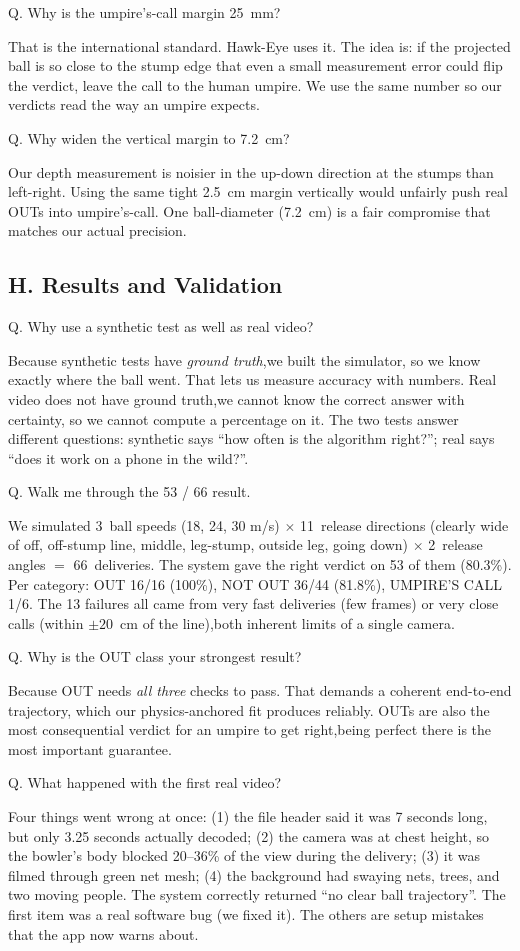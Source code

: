 \documentclass[11pt,a4paper]{article}
\newcommand{\qa}[2]{%
  \par\vspace{8pt}%
  \noindent
  \colorbox{NavyTint}{%
    \begin{minipage}{\dimexpr\textwidth-2\fboxsep\relax}%
      \color{white}\bfseries\strut Q. #1%
    \end{minipage}%
  }\par\nobreak
  \noindent
  \colorbox{MutedBg}{%
    \begin{minipage}{\dimexpr\textwidth-2\fboxsep\relax}%
      \color{black}\setlength{\parskip}{4pt}\strut #2\strut%
    \end{minipage}%
  }%
  \par\vspace{6pt}%
}
\begin{document}
\qa{Why is the umpire's-call margin 25~mm?}{%
That is the international standard. Hawk-Eye uses it. The idea is: if the projected ball is so close to the stump edge that even a small measurement error could flip the verdict, leave the call to the human umpire. We use the same number so our verdicts read the way an umpire expects.}

\qa{Why widen the vertical margin to 7.2~cm?}{%
Our depth measurement is noisier in the up-down direction at the stumps than left-right. Using the same tight 2.5~cm margin vertically would unfairly push real OUTs into umpire's-call. One ball-diameter (7.2~cm) is a fair compromise that matches our actual precision.}

\subsection{H. Results and Validation}

\qa{Why use a synthetic test as well as real video?}{%
Because synthetic tests have \emph{ground truth},we built the simulator, so we know exactly where the ball went. That lets us measure accuracy with numbers. Real video does not have ground truth,we cannot know the correct answer with certainty, so we cannot compute a percentage on it. The two tests answer different questions: synthetic says ``how often is the algorithm right?''; real says ``does it work on a phone in the wild?''.}

\qa{Walk me through the 53 / 66 result.}{%
We simulated 3~ball speeds (18, 24, 30 m/s) $\times$ 11~release directions (clearly wide of off, off-stump line, middle, leg-stump, outside leg, going down) $\times$ 2~release angles $=$ 66~deliveries. The system gave the right verdict on 53 of them (80.3\%). Per category: OUT 16/16 (100\%), NOT OUT 36/44 (81.8\%), UMPIRE'S CALL 1/6. The 13 failures all came from very fast deliveries (few frames) or very close calls (within ${\pm}20$~cm of the line),both inherent limits of a single camera.}

\qa{Why is the OUT class your strongest result?}{%
Because OUT needs \emph{all three} checks to pass. That demands a coherent end-to-end trajectory, which our physics-anchored fit produces reliably. OUTs are also the most consequential verdict for an umpire to get right,being perfect there is the most important guarantee.}

\qa{What happened with the first real video?}{%
Four things went wrong at once: (1) the file header said it was 7 seconds long, but only 3.25 seconds actually decoded; (2) the camera was at chest height, so the bowler's body blocked 20--36\% of the view during the delivery; (3) it was filmed through green net mesh; (4) the background had swaying nets, trees, and two moving people. The system correctly returned ``no clear ball trajectory''. The first item was a real software bug (we fixed it). The others are setup mistakes that the app now warns about.}
\end{document}
